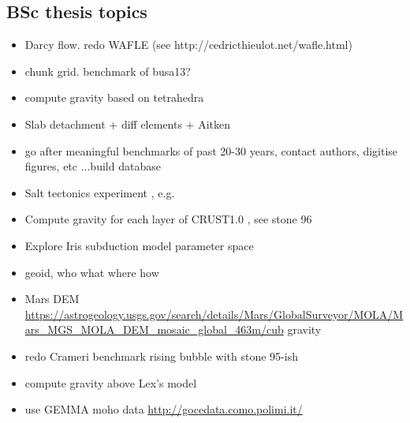 \subsection{BSc thesis topics}
\begin{itemize} 
\item Darcy flow. redo WAFLE (see http://cedricthieulot.net/wafle.html)
\item chunk grid. benchmark of busa13?
\item compute gravity based on tetrahedra
\item Slab detachment + diff elements + Aitken
\item go after meaningful benchmarks of past 20-30 years, contact authors, digitise figures, etc ...build database
\item Salt tectonics experiment , e.g. \cite{bers72} 
\item Compute gravity for each layer of CRUST1.0 , see stone 96
\item Explore Iris subduction model parameter space
\item geoid, who what where how
\item Mars DEM \url{https://astrogeology.usgs.gov/search/details/Mars/GlobalSurveyor/MOLA/Mars_MGS_MOLA_DEM_mosaic_global_463m/cub} gravity
\item redo Crameri benchmark rising bubble with stone 95-ish
\item compute gravity above Lex's model \cite{furc15}
\item use GEMMA moho data \url{http://gocedata.como.polimi.it/} \cite{resa15} 
\end{itemize}

